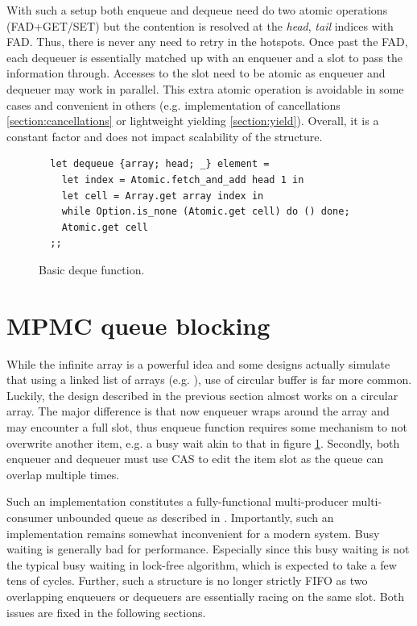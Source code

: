 \documentclass[12pt,a4paper,twoside]{report}
\begin{document}
With such a setup both enqueue and dequeue need do two atomic operations (FAD+GET/SET) but the contention is resolved at the \textit{head}, \textit{tail} indices with FAD. Thus, there is never any need to retry in the hotspots. Once past the FAD, each dequeuer is essentially matched up with an enqueuer and a slot to pass the information through. Accesses to the slot need to be atomic as enqueuer and dequeuer may work in parallel. This extra atomic operation is avoidable in some cases and convenient in others (e.g. implementation of cancellations \ref{section:cancellations} or lightweight yielding \ref{section:yield}). Overall, it is a constant factor and does not impact scalability of the structure.


\begin{figure}
    \centering
    \begin{verbatim}
  let dequeue {array; head; _} element = 
    let index = Atomic.fetch_and_add head 1 in
    let cell = Array.get array index in 
    while Option.is_none (Atomic.get cell) do () done;
    Atomic.get cell
  ;;
    \end{verbatim}
    \caption{Basic deque function.}
    \label{fig:basic-deque}
\end{figure}

\section{MPMC queue blocking}
\label{section:blocking_mpmc}

While the infinite array is a powerful idea and some designs actually simulate that using a linked list of arrays (e.g. \cite{Sundell2011}), use of circular buffer is far more common. Luckily, the design described in the previous section almost works on a circular array. The major difference is that now enqueuer wraps around the array and may encounter a full slot, thus enqueue function requires some mechanism to not overwrite another item, e.g. a busy wait akin to that in figure \ref{fig:basic-deque}. Secondly, both enqueuer and dequeuer must use CAS to edit the item slot as the queue can overlap multiple times. 

Such an implementation constitutes a fully-functional multi-producer multi-consumer unbounded queue as described in \cite{Kappes2021}. Importantly, such an implementation remains somewhat inconvenient for a modern system. Busy waiting is generally bad for performance. Especially since this busy waiting is not the typical busy waiting in lock-free algorithm, which is expected to take a few tens of cycles. Further, such a structure is no longer strictly FIFO as two overlapping enqueuers or dequeuers are essentially racing on the same slot. Both issues are fixed in the following sections. 
\end{document}
